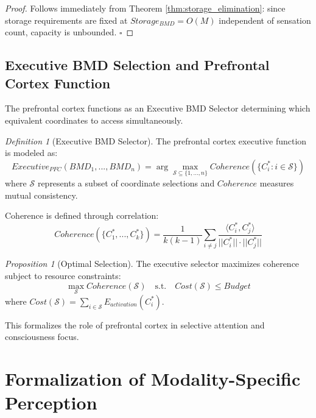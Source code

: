 \documentclass[12pt]{article}
\newtheorem{proposition}[theorem]{Proposition}
\theoremstyle{definition}
\newtheorem{definition}[theorem]{Definition}
\theoremstyle{remark}
\newtheorem{definition}[theorem]{Definition}
\newtheorem{proposition}[theorem]{Proposition}
\begin{document}
\begin{proof}
Follows immediately from Theorem \ref{thm:storage_elimination}: since storage requirements are fixed at $Storage_{BMD} = O(M)$ independent of sensation count, capacity is unbounded. $\square$
\end{proof}

\subsection{Executive BMD Selection and Prefrontal Cortex Function}

The prefrontal cortex functions as an Executive BMD Selector determining which equivalent coordinates to access simultaneously.

\begin{definition}[Executive BMD Selector]
\label{def:executive_bmd}
The prefrontal cortex executive function is modeled as:
\begin{equation}
Executive_{PFC}(BMD_1, ..., BMD_n) = \arg\max_{\mathcal{S} \subseteq \{1,...,n\}} Coherence(\{C_i^* : i \in \mathcal{S}\})
\end{equation}
where $\mathcal{S}$ represents a subset of coordinate selections and $Coherence$ measures mutual consistency.
\end{definition}

Coherence is defined through correlation:
\begin{equation}
Coherence(\{C_1^*, ..., C_k^*\}) = \frac{1}{k(k-1)} \sum_{i \neq j} \frac{\langle C_i^*, C_j^* \rangle}{||C_i^*|| \cdot ||C_j^*||}
\end{equation}

\begin{proposition}[Optimal Selection]
The executive selector maximizes coherence subject to resource constraints:
\begin{equation}
\max_{\mathcal{S}} Coherence(\mathcal{S}) \quad \text{s.t.} \quad Cost(\mathcal{S}) \leq Budget
\end{equation}
where $Cost(\mathcal{S}) = \sum_{i \in \mathcal{S}} E_{activation}(C_i^*)$.
\end{proposition}

This formalizes the role of prefrontal cortex in selective attention and consciousness focus.

\section{Formalization of Modality-Specific Perception}
\label{sec:modalities}
\end{document}
